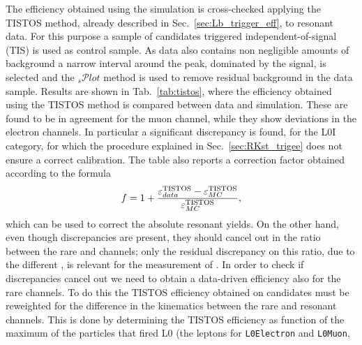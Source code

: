 The efficiency obtained using the simulation is cross-checked applying the TISTOS method, 
already described in Sec.~\ref{sec:Lb_trigger_eff}, to resonant data.
%
%
For this purpose a sample of \BdToKstJPsll candidates triggered independent-of-signal (TIS) is used
as control sample. As data also contains non negligible amounts of background 
a narrow interval around the peak, dominated by the signal, is selected and the $_{s}\mathcal{P}lot$ method
is used to remove residual background in the data sample. 
Results are shown in Tab.~\ref{tab:tistos}, where the
efficiency obtained using the TISTOS method is compared between data and simulation.
These are found to be in agreement for the muon channel,
while they show deviations in the electron channels. In particular a significant discrepancy is found,
for the L0I category, for which the procedure explained in Sec.~\ref{sec:RKst_trigee} does not ensure
a correct calibration. The table also reports a correction factor
obtained according to the formula
\begin{equation}
f = 1 + \frac{\varepsilon_{data}^{\rm TISTOS} - \varepsilon_{MC}^{\rm  TISTOS}}{\varepsilon_{MC}^{\rm  TISTOS}},
\end{equation}
which can be used to correct the absolute resonant yields.
%
On the other hand, even though discrepancies are present, they should cancel out in the ratio between the rare and \jpsi channels;
only the residual discrepancy on this ratio, due to the different \qsq, is relevant for the measurement of \RKst.
In order to check if discrepancies cancel out we need to obtain a data-driven efficiency
also for the rare channels. To do this the TISTOS efficiency obtained on \BdToKstJPsll candidates 
must be reweighted for the difference in the kinematics between the rare and resonant channels. This is done by determining
the TISTOS efficiency as function of the maximum \pt of the particles that fired L0 (the leptons for \verb!L0Electron! and \verb!L0Muon!,
